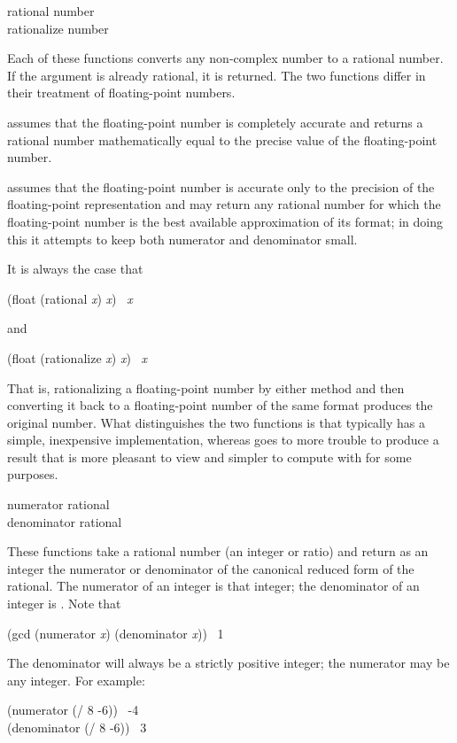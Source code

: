 \begin{defun}[Function]
rational number \\
rationalize number

Each of these functions converts any non-complex number to a rational
number.  If the argument is already rational, it is returned.
The two functions differ in their treatment of floating-point numbers.

 assumes that the floating-point number is completely accurate
and returns a rational number mathematically equal to the precise
value of the floating-point number.

 assumes that the
floating-point number is accurate only to the precision of the
floating-point representation and may return any rational number for
which the floating-point number is the best available approximation of
its format; in doing this it attempts to keep both numerator and
denominator small.

It is always the case that
\begin{lisp}
(float (rational {\it x}) {\it x}) \EQ\ {\it x}
\end{lisp}
and
\begin{lisp}
(float (rationalize {\it x}) {\it x}) \EQ\ {\it x}
\end{lisp}
That is, rationalizing a floating-point number by either method
and then converting it back
to a floating-point number of the same format produces the original number.
What distinguishes the two functions is that  typically
has a simple, inexpensive implementation, whereas  goes
to more trouble to produce a result that is more pleasant to view and
simpler to compute with for some purposes.
\end{defun}

\begin{defun}[Function]
numerator rational \\
denominator rational

These functions take a rational number (an integer or ratio)
and return as an integer the numerator or denominator of the canonical
reduced form of the rational.  The numerator of an integer is that integer;
the denominator of an integer is .  Note that
\begin{lisp}
(gcd (numerator {\it x}) (denominator {\it x})) \EV\ 1
\end{lisp}
The denominator will always be a strictly positive integer;
the numerator may be any integer.
For example:
\begin{lisp}
(numerator (/ 8 -6)) \EV\ -4 \\
(denominator (/ 8 -6)) \EV\ 3
\end{lisp}
\end{defun}

